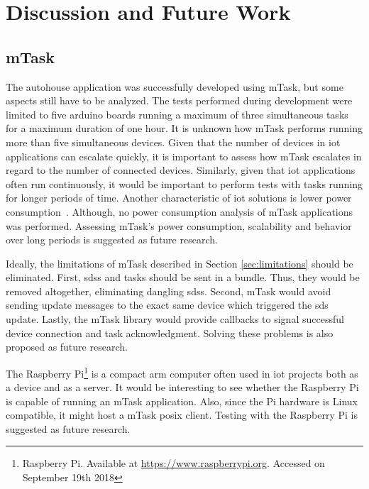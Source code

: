 \section{Discussion and Future Work}

\subsection{mTask}

The \gls{autohouse} application was successfully developed using \gls{mTask}, but some aspects still have to be analyzed. The tests performed during development were limited to five \gls{arduino} boards running a maximum of three simultaneous tasks for a maximum duration of one hour. It is unknown how \gls{mTask} performs running more than five simultaneous devices. Given that the number of devices in \acs{iot} applications can escalate quickly, it is important to assess how \gls{mTask} escalates in regard to the number of connected devices. Similarly, given that \acs{iot} applications often run continuously, it would be important to perform tests with tasks running for longer periods of time. Another characteristic of \acs{iot} solutions is lower power consumption~\cite{survey,survey2,survey3}. Although, no power consumption analysis of \gls{mTask} applications was performed. Assessing \gls{mTask}'s power consumption, scalability and behavior over long periods is suggested as future research. 

Ideally, the limitations of \gls{mTask} described in Section \ref{sec:limitations} should be eliminated. First, \acsp{sds} and tasks should be sent in a bundle. Thus, they would be removed altogether, eliminating dangling \acsp{sds}. Second, \gls{mTask} would avoid sending update messages to the exact same device which triggered the \acs{sds} update. Lastly, the \gls{mTask} library would provide callbacks to signal successful device connection and task acknowledgment. Solving these problems is also proposed as future research.

The Raspberry Pi\footnote{Raspberry Pi. Available at \url{https://www.raspberrypi.org}. Accessed on September 19th 2018} is a compact \acs{arm} computer often used in \acs{iot} projects both as a device and as a server. It would be interesting to see whether the Raspberry Pi is capable of running an \gls{mTask} application. Also, since the Pi hardware is Linux compatible, it might host a \gls{mTask} \acs{posix} client. Testing with the Raspberry Pi is suggested as future research.

